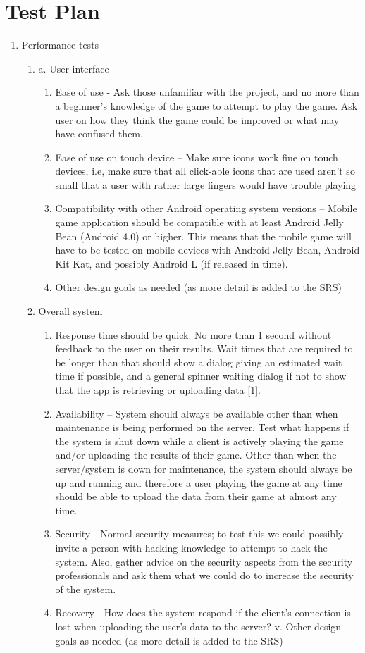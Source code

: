 \documentclass[a4wide]{article}
\begin{document}
\section{Test Plan}
\begin{enumerate}
\item Performance tests
\begin{enumerate}


\item a.	User interface
\begin{enumerate}
\item	Ease of use - Ask those unfamiliar with the project, and no more than a beginner’s knowledge of the game to attempt to play the game. Ask user on how they think the game could be improved or what may have confused them.
\item	Ease of use on touch device – Make sure icons work fine on touch devices, i.e, make sure that all click-able icons that are used aren't so small that a user with rather large fingers would have trouble playing
\item	Compatibility with other Android operating system versions – Mobile game application should be compatible with at least Android Jelly Bean (Android 4.0) or higher. This means that the mobile game will have to be tested on mobile devices with Android Jelly Bean, Android Kit Kat, and possibly Android L (if released in time).
\item 	Other design goals as needed (as more detail is added to the SRS)
\end{enumerate}
\item	Overall system
\begin{enumerate}
\item	 Response time should be quick. No more than 1 second without feedback to the user on their results. Wait times that are required to be longer than that should show a dialog giving an estimated wait time if possible, and a general spinner waiting dialog if not  to show that the app is retrieving or uploading data [1].
\item	Availability – System should always be available other than when maintenance is being performed on the server. Test what happens if the system is shut down while a client is actively playing the game and/or uploading the results of their game. Other than when the server/system is down for maintenance, the system should always be up and running and therefore a user playing the game at any time should be able to upload the data from their game at almost any time.
\item	Security - Normal security measures; to test this we could possibly invite a person with hacking knowledge to attempt to hack the system. Also, gather advice on the security aspects from the security professionals  and ask them what we could do to increase the security of the system.
\item	Recovery - How does the system respond if the client’s connection is lost when uploading the user’s data to the server?
v.	Other design goals as needed (as more detail is added to the SRS)
\end{enumerate}


\end{enumerate}
\end{enumerate}
\end{document}
